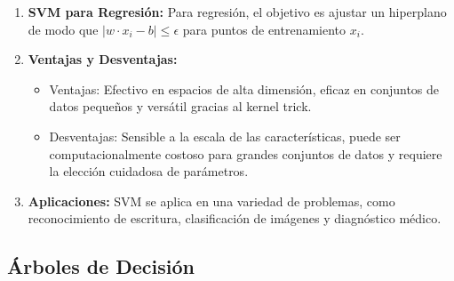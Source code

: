 \documentclass[12pt]{article}
\begin{document}
\begin{enumerate}
    \item \textbf{SVM para Regresión:}
        Para regresión, el objetivo es ajustar un hiperplano de modo que \(|w \cdot x_i - b| \leq \epsilon\) para puntos de entrenamiento \(x_i\).

    \item \textbf{Ventajas y Desventajas:}
        \begin{itemize}
            \item Ventajas: Efectivo en espacios de alta dimensión, eficaz en conjuntos de datos pequeños y versátil gracias al kernel trick.
            \item Desventajas: Sensible a la escala de las características, puede ser computacionalmente costoso para grandes conjuntos de datos y requiere la elección cuidadosa de parámetros.
        \end{itemize}

    \item \textbf{Aplicaciones:}
        SVM se aplica en una variedad de problemas, como reconocimiento de escritura, clasificación de imágenes y diagnóstico médico.
\end{enumerate}


\subsection{Árboles de Decisión}
\end{document}
